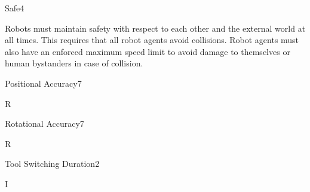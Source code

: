 \begin{nonfunctional_requirement}{Safe}{4}
\label{nfr:safe}
\item Robots must maintain safety with respect to each other and the external world at all times. This requires that all robot agents avoid collisions. Robot agents must also have an enforced maximum speed limit to avoid damage to themselves or human bystanders in case of collision. 
\end{nonfunctional_requirement}

\begin{nonfunctional_requirement}{Positional Accuracy}{7}
\label{nfr:pos_accuracy}
\item R
\end{nonfunctional_requirement}

\begin{nonfunctional_requirement}{Rotational Accuracy}{7}
\label{nfr:rot_accuracy}
\item R
\end{nonfunctional_requirement}

\begin{nonfunctional_requirement}{Tool Switching Duration}{2}
\label{nfr:tool_switch_duration}
\item I
\end{nonfunctional_requirement}



